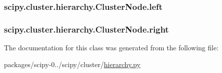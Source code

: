 \subsubsection[{left}]{\setlength{\rightskip}{0pt plus 5cm}scipy.\+cluster.\+hierarchy.\+Cluster\+Node.\+left}\label{classscipy_1_1cluster_1_1hierarchy_1_1ClusterNode_a289f67739ecb94da191ec5d6f5a4977a}
\hypertarget{classscipy_1_1cluster_1_1hierarchy_1_1ClusterNode_a79b2cad6da3ba1a2d9962ccd7cacf3f4}{}
\subsubsection[{right}]{\setlength{\rightskip}{0pt plus 5cm}scipy.\+cluster.\+hierarchy.\+Cluster\+Node.\+right}\label{classscipy_1_1cluster_1_1hierarchy_1_1ClusterNode_a79b2cad6da3ba1a2d9962ccd7cacf3f4}


The documentation for this class was generated from the following file\+:\begin{DoxyCompactItemize}
\item 
packages/scipy-\/0../scipy/cluster/\hyperlink{hierarchy_8py}{hierarchy.\+py}\end{DoxyCompactItemize}
